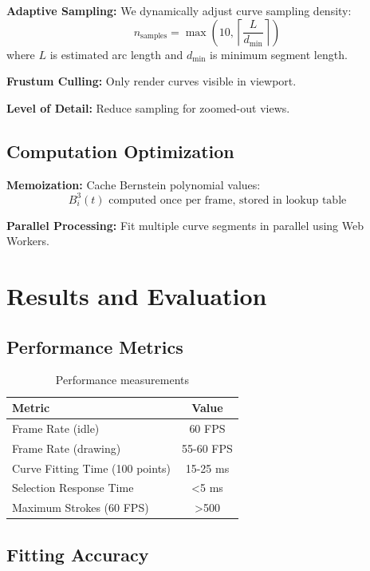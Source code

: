 \documentclass[12pt,a4paper]{article}
\begin{document}
\textbf{Adaptive Sampling:} We dynamically adjust curve sampling density:
\begin{equation}
n_{\text{samples}} = \max\left(10, \left\lceil \frac{L}{d_{\text{min}}} \right\rceil\right)
\end{equation}
where $L$ is estimated arc length and $d_{\text{min}}$ is minimum segment length.

\textbf{Frustum Culling:} Only render curves visible in viewport.

\textbf{Level of Detail:} Reduce sampling for zoomed-out views.

\subsection{Computation Optimization}

\textbf{Memoization:} Cache Bernstein polynomial values:
\begin{equation}
B_i^3(t) \text{ computed once per frame, stored in lookup table}
\end{equation}

\textbf{Parallel Processing:} Fit multiple curve segments in parallel using Web Workers.

\section{Results and Evaluation}

\subsection{Performance Metrics}

\begin{table}[h]
\centering
\begin{tabular}{|l|c|}
\hline
\textbf{Metric} & \textbf{Value} \\
\hline
Frame Rate (idle) & 60 FPS \\
Frame Rate (drawing) & 55-60 FPS \\
Curve Fitting Time (100 points) & 15-25 ms \\
Selection Response Time & <5 ms \\
Maximum Strokes (60 FPS) & >500 \\
\hline
\end{tabular}
\caption{Performance measurements}
\end{table}

\subsection{Fitting Accuracy}
\end{document}
